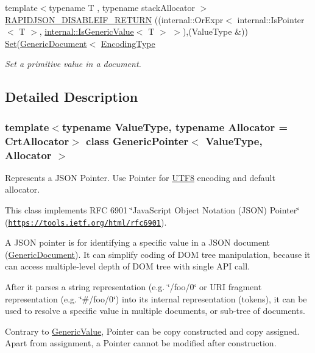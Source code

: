 \begin{DoxyCompactItemize}
{\footnotesize template$<$typename T , typename stack\+Allocator $>$ }\\\hyperlink{a02232_a1bb4a253f33687734e5b20795632a801}{R\+A\+P\+I\+D\+J\+S\+O\+N\+\_\+\+D\+I\+S\+A\+B\+L\+E\+I\+F\+\_\+\+R\+E\+T\+U\+RN} ((internal\+::\+Or\+Expr$<$ internal\+::\+Is\+Pointer$<$ T $>$, \hyperlink{a02020}{internal\+::\+Is\+Generic\+Value}$<$ T $>$ $>$),(Value\+Type \&)) \hyperlink{a02232_a71476d125a276b62a246990da1bd3468}{Set}(\hyperlink{a01996}{Generic\+Document}$<$ \hyperlink{a02232_a4b802da797a7a0b615fd9611cedb7c3b}{Encoding\+Type}
\begin{DoxyCompactList}\small\item\em Set a primitive value in a document. \end{DoxyCompactList}\end{DoxyCompactItemize}


\subsection{Detailed Description}
\subsubsection*{template$<$typename Value\+Type, typename Allocator = Crt\+Allocator$>$\newline
class Generic\+Pointer$<$ Value\+Type, Allocator $>$}

Represents a J\+S\+ON Pointer. Use Pointer for \hyperlink{a02144}{U\+T\+F8} encoding and default allocator. 

This class implements R\+FC 6901 \char`\"{}\+Java\+Script Object Notation (\+J\+S\+O\+N) Pointer\char`\"{} (\href{https://tools.ietf.org/html/rfc6901}{\tt https\+://tools.\+ietf.\+org/html/rfc6901}).

A J\+S\+ON pointer is for identifying a specific value in a J\+S\+ON document (\hyperlink{a01996}{Generic\+Document}). It can simplify coding of D\+OM tree manipulation, because it can access multiple-\/level depth of D\+OM tree with single A\+PI call.

After it parses a string representation (e.\+g. \char`\"{}/foo/0\char`\"{} or U\+RI fragment representation (e.\+g. \char`\"{}\#/foo/0\char`\"{}) into its internal representation (tokens), it can be used to resolve a specific value in multiple documents, or sub-\/tree of documents.

Contrary to \hyperlink{a01992}{Generic\+Value}, Pointer can be copy constructed and copy assigned. Apart from assignment, a Pointer cannot be modified after construction.

